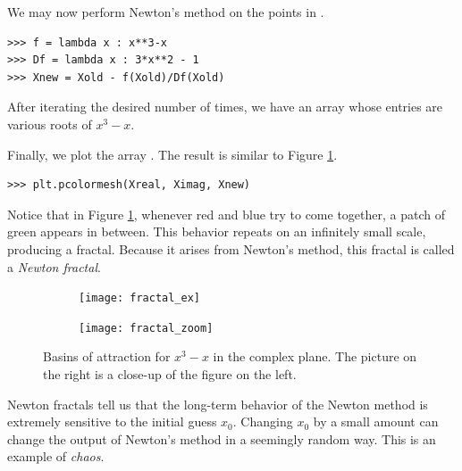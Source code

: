 We may now perform Newton's method on the points in . 
\begin{lstlisting}
>>> f = lambda x : x**3-x
>>> Df = lambda x : 3*x**2 - 1
>>> Xnew = Xold - f(Xold)/Df(Xold)
\end{lstlisting}
After iterating the desired number of times, we have an array  whose entries are various roots of $x^3-x$.

Finally, we plot the array . The result is similar to Figure \ref{fig:fractal_ex}.
\begin{lstlisting}
>>> plt.pcolormesh(Xreal, Ximag, Xnew)
\end{lstlisting}

Notice that in Figure \ref{fig:fractal_ex}, whenever red and blue try to come together, a patch of green appears in between.
This behavior repeats on an infinitely small scale, producing a fractal.
Because it arises from Newton's method, this fractal is called a \emph{Newton fractal}.

\begin{figure}
\begin{center}
\begin{subfigure}[b]{.49\textwidth}
\centering
\texttt{[image: fractal\_ex]}
\end{subfigure}
\begin{subfigure}[b]{.49\textwidth}
\centering
\texttt{[image: fractal\_zoom]}
\end{subfigure}
\caption{ Basins of attraction for $x^3-x$ in the complex plane. 
The picture on the right is a close-up of the figure on the left.}
\label{fig:fractal_ex}
\end{center}
\end{figure}

Newton fractals tell us that the long-term behavior of the Newton method is extremely sensitive to the initial guess $x_0$.
Changing $x_0$ by a small amount can change the output of Newton's method in a seemingly random way.
This is an example of \emph{chaos}.





